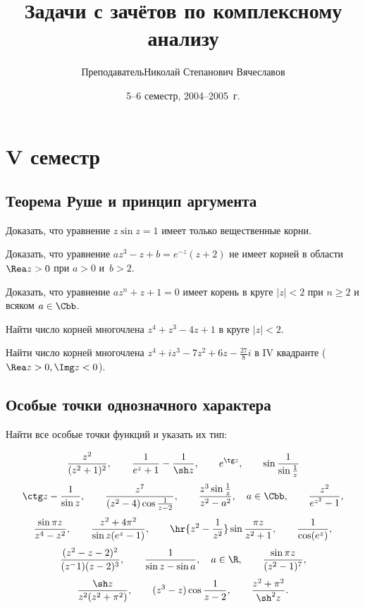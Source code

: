 \documentclass[a4paper]{article}
\title{Задачи с зачётов по комплексному анализу}
\author{Преподаватель\т Николай Степанович Вячеславов}
\date{5--6 семестр, 2004--2005~г.}
\begin{document}
\maketitle

\section{V семестр}

\subsection{Теорема Руше и принцип аргумента}

\begin{problem}
Доказать, что уравнение $z \sin z = 1$ имеет только вещественные корни.
\end{problem}

\begin{problem}
Доказать, что уравнение $az^3-z+b = e^{-z}(z+2)$ не имеет корней в области $\Rea z > 0$ при ${a>0}$ и~${b > 2}$.
\end{problem}

\begin{problem}
Доказать, что уравнение $az^n+z+1 = 0$ имеет корень в круге $|z|< 2$ при $n \ge 2$ и всяком $a \in \Cbb$.
\end{problem}

\begin{problem}
Найти число корней многочлена $z^4+z^3-4z+1$ в круге $|z| < 2$.
\end{problem}

\begin{problem}
Найти число корней многочлена $z^4+iz^3-7z^2+6z-\frac{27}{8}i$ в IV квадранте ($\Rea z > 0, \Img z < 0$).
\end{problem}

\subsection{Особые точки однозначного характера}

Найти все особые точки функций и указать их тип:

$$\frac{z^2}{(z^2+1)^2}, \qquad \frac{1}{e^z+1} - \frac{1}{\sh z}, \qquad e^{\tg z}, \qquad \sin\frac{1}{\sin\frac1z}$$
$$\ctg z - \frac{1}{\sin z}, \qquad \frac{z^7}{(z^2-4)\cos\frac1{z-2}}, \qquad \frac{z^3\sin\frac1z}{z^2-a^2}, \quad a \in \Cbb,\qquad \frac{z^2}{e^{z^2}-1},$$
$$\frac{\sin \pi z}{z^4-z^2}, \qquad \frac{z^2+4\pi^2}{\sin z(e^z-1)},\qquad \hr{z^2-\frac1{z^2}}\sin\frac{\pi z}{z^2+1},\qquad \frac{1}{\cos (e^z)},$$
$$\frac{(z^2-z-2)^2}{(z^-1)(z-2)^3},\qquad \frac{1}{\sin z - \sin a}, \quad a\in\R,\qquad \frac{\sin \pi z}{(z^2-1)^7},$$
$$\frac{\sh z}{z^2(z^2+\pi^2)},\qquad (z^3-z)\cos\frac{1}{z-2},\qquad \frac{z^2+\pi^2}{\sh^2z}.$$
\end{document}
